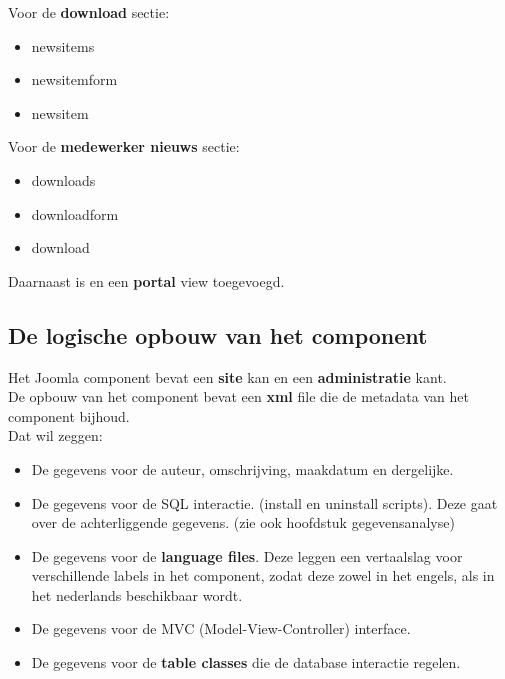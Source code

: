 \documentclass{article}
\begin{document}
Voor de \textbf{download} sectie: \\

\begin{itemize}
\item newsitems
\item newsitemform
\item newsitem
\end{itemize}

Voor de \textbf{medewerker nieuws} sectie: \\

\begin{itemize}
\item downloads
\item downloadform
\item download
\end{itemize}


Daarnaast is en een \textbf{portal} view toegevoegd.

\subsection{De logische opbouw van het component}

Het Joomla component bevat een \textbf{site} kan en een \textbf{administratie} kant. \\
De opbouw van het component bevat een \textbf{xml} file die de metadata van het component bijhoud. \\
Dat wil zeggen: \\
\begin{itemize}
\item De gegevens voor de auteur, omschrijving, maakdatum en dergelijke. \\
\item De gegevens voor de SQL interactie. (install en uninstall scripts). Deze gaat over de achterliggende gegevens. (zie ook hoofdstuk gegevensanalyse)  \\
\item De gegevens voor de \textbf{language files}. Deze leggen een vertaalslag voor verschillende labels in het component, zodat deze zowel in het engels, als in het nederlands beschikbaar wordt.
\item De gegevens voor de MVC (Model-View-Controller) interface.\\
\item De gegevens voor de \textbf{table classes} die de database interactie regelen. \\
\end{itemize}
\end{document}

